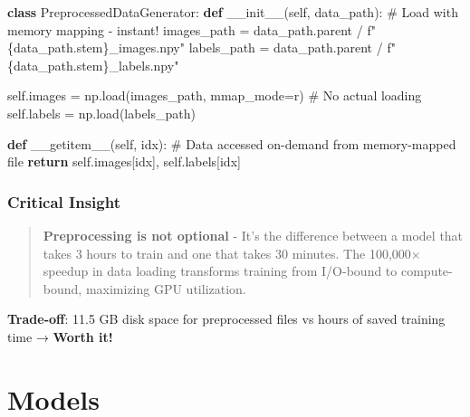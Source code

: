 \documentclass[
  letterpaper,
  DIV=11,
  numbers=noendperiod]{scrartcl}
\newenvironment{Shaded}{\begin{snugshade}}{\end{snugshade}}
\newcommand{\CommentTok}[1]{\textcolor[rgb]{0.37,0.37,0.37}{#1}}
\newcommand{\ControlFlowTok}[1]{\textcolor[rgb]{0.00,0.23,0.31}{\textbf{#1}}}
\newcommand{\FunctionTok}[1]{\textcolor[rgb]{0.28,0.35,0.67}{#1}}
\newcommand{\KeywordTok}[1]{\textcolor[rgb]{0.00,0.23,0.31}{\textbf{#1}}}
\newcommand{\NormalTok}[1]{\textcolor[rgb]{0.00,0.23,0.31}{#1}}
\newcommand{\OperatorTok}[1]{\textcolor[rgb]{0.37,0.37,0.37}{#1}}
\newcommand{\SpecialCharTok}[1]{\textcolor[rgb]{0.37,0.37,0.37}{#1}}
\newcommand{\SpecialStringTok}[1]{\textcolor[rgb]{0.13,0.47,0.30}{#1}}
\newcommand{\StringTok}[1]{\textcolor[rgb]{0.13,0.47,0.30}{#1}}
\newcommand{\VariableTok}[1]{\textcolor[rgb]{0.07,0.07,0.07}{#1}}
\renewenvironment{Shaded}{%
  \begin{tcolorbox}[%
    enhanced,%
    colback=codebg,%
    colframe=codebg,%
    borderline west={3pt}{0pt}{sectionblue},%
    boxrule=0pt,%
    arc=0pt,%
    boxsep=5pt,%
    left=2mm,%
    right=2mm,%
    top=2mm,%
    bottom=2mm%
  ]%
}{%
  \end{tcolorbox}%
}
\begin{document}
\begin{Shaded}
\begin{Highlighting}[]
\KeywordTok{class}\NormalTok{ PreprocessedDataGenerator:}
    \KeywordTok{def} \FunctionTok{\_\_init\_\_}\NormalTok{(}\VariableTok{self}\NormalTok{, data\_path):}
        \CommentTok{\# Load with memory mapping {-} instant!}
\NormalTok{        images\_path }\OperatorTok{=}\NormalTok{ data\_path.parent }\OperatorTok{/} \SpecialStringTok{f"}\SpecialCharTok{\{}\NormalTok{data\_path}\SpecialCharTok{.}\NormalTok{stem}\SpecialCharTok{\}}\SpecialStringTok{\_images.npy"}
\NormalTok{        labels\_path }\OperatorTok{=}\NormalTok{ data\_path.parent }\OperatorTok{/} \SpecialStringTok{f"}\SpecialCharTok{\{}\NormalTok{data\_path}\SpecialCharTok{.}\NormalTok{stem}\SpecialCharTok{\}}\SpecialStringTok{\_labels.npy"}
        
        \VariableTok{self}\NormalTok{.images }\OperatorTok{=}\NormalTok{ np.load(images\_path, mmap\_mode}\OperatorTok{=}\StringTok{\textquotesingle{}r\textquotesingle{}}\NormalTok{)  }\CommentTok{\# No actual loading}
        \VariableTok{self}\NormalTok{.labels }\OperatorTok{=}\NormalTok{ np.load(labels\_path)}
        
    \KeywordTok{def} \FunctionTok{\_\_getitem\_\_}\NormalTok{(}\VariableTok{self}\NormalTok{, idx):}
        \CommentTok{\# Data accessed on{-}demand from memory{-}mapped file}
        \ControlFlowTok{return} \VariableTok{self}\NormalTok{.images[idx], }\VariableTok{self}\NormalTok{.labels[idx]}
\end{Highlighting}
\end{Shaded}

\subsubsection{Critical Insight}\label{critical-insight}

\begin{quote}
\textbf{Preprocessing is not optional} - It's the difference between a
model that takes 3 hours to train and one that takes 30 minutes. The
100,000× speedup in data loading transforms training from I/O-bound to
compute-bound, maximizing GPU utilization.
\end{quote}

\textbf{Trade-off}: 11.5 GB disk space for preprocessed files vs hours
of saved training time → \textbf{Worth it!}

\section{Models}\label{models}
\end{document}
